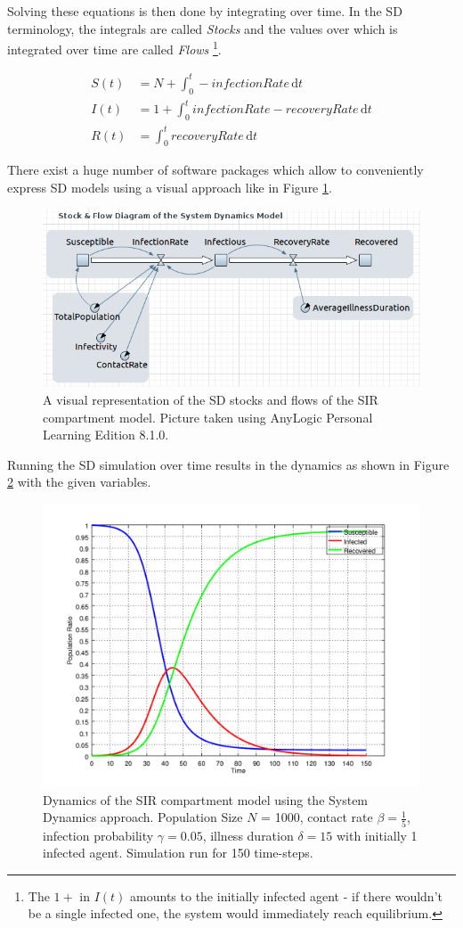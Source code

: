 Solving these equations is then done by integrating over time. In the SD terminology, the integrals are called \textit{Stocks} and the values over which is integrated over time are called \textit{Flows} \footnote{The $1+$ in $I(t)$ amounts to the initially infected agent - if there wouldn't be a single infected one, the system would immediately reach equilibrium.}.

\begin{align*}
S(t) &= N + \int_0^t -infectionRate\, \mathrm{d}t \\
I(t) &= 1 + \int_0^t infectionRate - recoveryRate\, \mathrm{d}t \\
R(t) &= \int_0^t recoveryRate\, \mathrm{d}t
\end{align*}

There exist a huge number of software packages which allow to conveniently express SD models using a visual approach like in Figure \ref{fig:sir_sd_stockflow_diagramm}.

\begin{figure}
	\centering
	\includegraphics[width=.4\textwidth, angle=0]{./../shared/fig/diagrams/SIR_SD_STOCKFLOW_DIAGRAMM.png}
	\caption{A visual representation of the SD stocks and flows of the SIR compartment model. Picture taken using AnyLogic Personal Learning Edition 8.1.0.}
	\label{fig:sir_sd_stockflow_diagramm}
\end{figure}

Running the SD simulation over time results in the dynamics as shown in Figure \ref{fig:sir_sd_dynamics} with the given variables.

\begin{figure}
	\centering
	\includegraphics[width=.4\textwidth, angle=0]{./../shared/fig/frsd/SIR_SD_1000agents_150t_001dt.png}
	\caption{Dynamics of the SIR compartment model using the System Dynamics approach. Population Size $N$ = 1000, contact rate $\beta =  \frac{1}{5}$, infection probability $\gamma = 0.05$, illness duration $\delta = 15$ with initially 1 infected agent. Simulation run for 150 time-steps.}
	\label{fig:sir_sd_dynamics}
\end{figure}

